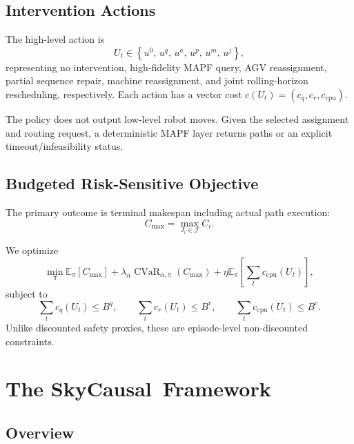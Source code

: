 \documentclass[11pt,a4paper]{article}
\newcommand{\method}{SkyCausal}
\newcommand{\cmax}{C_{\max}}
\newcommand{\cvar}{\operatorname{CVaR}}
\newcommand{\E}{\mathbb{E}}
\begin{document}
\subsection{Intervention Actions}

The high-level action is
\begin{equation}
    U_t \in
    \left\{
    u^0,\,
    u^q,\,
    u^a,\,
    u^p,\,
    u^m,\,
    u^j
    \right\},
\end{equation}
representing no intervention, high-fidelity MAPF query, AGV reassignment,
partial sequence repair, machine reassignment, and joint rolling-horizon
rescheduling, respectively. Each action has a vector cost
\(c(U_t)=(c_q,c_r,c_{\mathrm{cpu}})\).

The policy does not output low-level robot moves. Given the selected assignment
and routing request, a deterministic MAPF layer returns paths or an explicit
timeout/infeasibility status.

\subsection{Budgeted Risk-Sensitive Objective}

The primary outcome is terminal makespan including actual path execution:
\begin{equation}
    \cmax = \max_{J_i\in\mathcal{J}} C_i.
\end{equation}

We optimize
\begin{equation}
    \min_\pi
    \E_\pi[\cmax]
    +\lambda_{\alpha}\cvar_{\alpha,\pi}(\cmax)
    +\eta \E_\pi\!\left[\sum_t c_{\mathrm{cpu}}(U_t)\right],
    \label{eq:objective}
\end{equation}
subject to
\begin{equation}
    \sum_t c_q(U_t)\le B^q,\qquad
    \sum_t c_r(U_t)\le B^r,\qquad
    \sum_t c_{\mathrm{cpu}}(U_t)\le B^c.
    \label{eq:budgets}
\end{equation}
Unlike discounted safety proxies, these are episode-level non-discounted
constraints.

\section{The \method\ Framework}
\label{sec:method}

\subsection{Overview}
\end{document}
